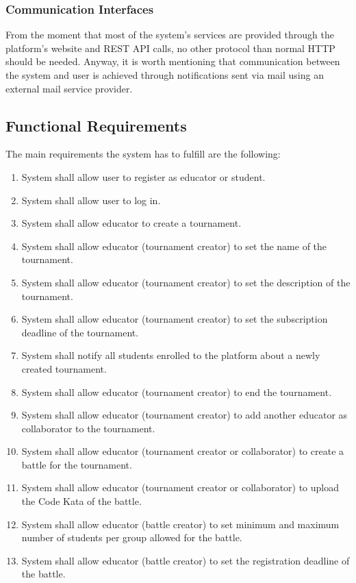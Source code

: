 \subsubsection{Communication Interfaces}
From the moment that most of the system’s services are provided through the platform’s website and REST API calls, no other protocol than normal HTTP should be needed. Anyway, it is worth mentioning that communication between the system and user is achieved through notifications sent via mail using an external mail service provider.

\subsection{Functional Requirements}
The main requirements the system has to fulfill are the following:
\begin{enumerate}[label=$\bullet$ \textbf{R\arabic*:}]
    \item System shall allow user to register as educator or student.
    \item System shall allow user to log in.
    \item System shall allow educator to create a tournament.
    \item System shall allow educator (tournament creator) to set the name of the tournament.
    \item System shall allow educator (tournament creator) to set the description of the tournament.
    \item System shall allow educator (tournament creator) to set the subscription deadline of the tournament.
    \item System shall notify all students enrolled to the platform about a newly created tournament.
    \item System shall allow educator (tournament creator) to end the tournament.
    \item System shall allow educator (tournament creator) to add another educator as collaborator to the tournament.
    \item System shall allow educator (tournament creator or collaborator) to create a battle for the tournament.
    \item System shall allow educator (tournament creator or collaborator) to upload the Code Kata of the battle.
    \item System shall allow educator (battle creator) to set minimum and maximum number of students per group allowed for the battle.
    \item System shall allow educator (battle creator) to set the registration deadline of the battle.

\end{enumerate}
